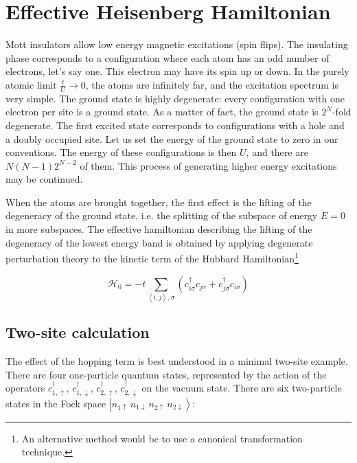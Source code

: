 \section{Effective Heisenberg Hamiltonian}\label{sec:effectiveHeisenberg}

Mott insulators allow low energy magnetic excitations (spin flips).
The insulating phase corresponds to a configuration where each atom has an odd number of electrons, let's say one.
This electron may have its spin up or down.
In the purely atomic limit $\frac{t}{U} \rightarrow 0$, the atoms are infinitely far, and the excitation spectrum is very simple.
The ground state is highly degenerate: every configuration with one electron per site is a ground state.
As a matter of fact, the ground state is $2^N$-fold degenerate.
The first excited state corresponds to configurations with a hole and a doubly occupied site.
Let us set the energy of the ground state to zero in our conventions.
The energy of these configurations is then $U$, and there are $N(N-1)2^{N-2}$ of them.
This process of generating higher energy excitations may be continued.

When the atoms are brought together, the first effect is the lifting of the degeneracy of the ground state, i.e. the splitting of the subspace of energy $E = 0$ in more subspaces.
The effective hamiltonian describing the lifting of the degeneracy of the lowest energy band is obtained by applying degenerate perturbation theory \cite{mila_physique_2007} to the kinetic term of the Hubbard Hamiltonian\footnote{An alternative method would be to use a canonical transformation technique.}

\begin{equation}
\mathcal{H}_0 = - t \sum_{\left\langle i, j \right\rangle, \sigma} ( c_{i\sigma}^\dagger c_{j\sigma} + c_{j\sigma}^\dagger c_{i\sigma} ) 
\end{equation}

\subsection{Two-site calculation}

The effect of the hopping term is best understood in a minimal two-site example.
There are four one-particle quantum states, represented by the action of the operators $c_{1,\uparrow}^\dagger$, $c_{1,\downarrow}^\dagger$, $c_{2,\uparrow}^\dagger$, $c_{2,\downarrow}^\dagger$ on the vacuum state.
There are six two-particle states in the Fock space $\left| n_{1\uparrow} \,  n_{1\downarrow} \,  n_{2\uparrow} \, n_{2\downarrow} \right\rangle$:

